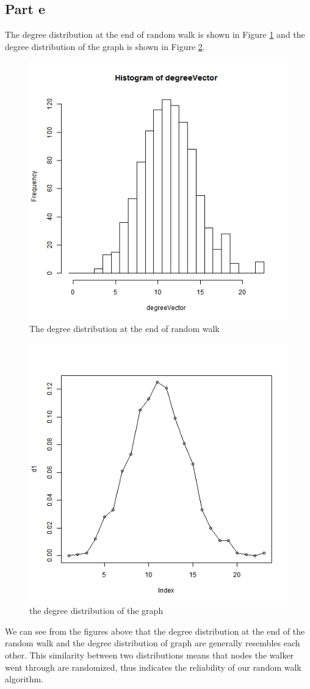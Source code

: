 \documentclass{article}
\begin{document}
\subsection{Part e}
The degree distribution at the end of random walk is shown in Figure \ref{fig:p1_e1} and the degree distribution of the graph is shown in Figure \ref{fig:p1_e2}.\\

\begin{figure}[htbp]
\centering
\includegraphics[width=.6\textwidth]{Q1e.png}
\caption{The degree distribution at the end of random walk}
\label{fig:p1_e1}
\end{figure}

\begin{figure}[htbp]
\centering
\includegraphics[width=.6\textwidth]{Q1a_1.png}
\caption{the degree distribution of the graph}
\label{fig:p1_e2}
\end{figure}
\noindent We can see from the figures above that the degree distribution at the end of the random walk and the degree distribution of graph are generally resembles each other.
This similarity between two distributions means that nodes the walker went through are randomized, thus indicates the reliability of our random walk algorithm.
\end{document}
